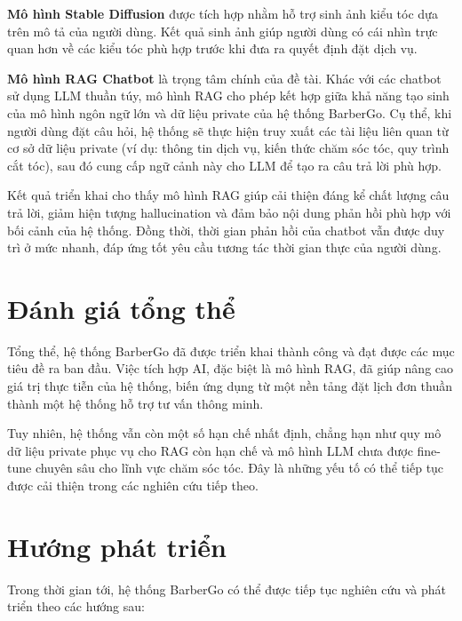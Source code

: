 \textbf{Mô hình Stable Diffusion} được tích hợp nhằm hỗ trợ sinh ảnh kiểu tóc dựa trên mô tả của người dùng. Kết quả sinh ảnh giúp người dùng có cái nhìn trực quan hơn về các kiểu tóc phù hợp trước khi đưa ra quyết định đặt dịch vụ.

\textbf{Mô hình RAG Chatbot} là trọng tâm chính của đề tài. Khác với các chatbot sử dụng LLM thuần túy, mô hình RAG cho phép kết hợp giữa khả năng tạo sinh của mô hình ngôn ngữ lớn và dữ liệu private của hệ thống BarberGo. Cụ thể, khi người dùng đặt câu hỏi, hệ thống sẽ thực hiện truy xuất các tài liệu liên quan từ cơ sở dữ liệu private (ví dụ: thông tin dịch vụ, kiến thức chăm sóc tóc, quy trình cắt tóc), sau đó cung cấp ngữ cảnh này cho LLM để tạo ra câu trả lời phù hợp.

Kết quả triển khai cho thấy mô hình RAG giúp cải thiện đáng kể chất lượng câu trả lời, giảm hiện tượng hallucination và đảm bảo nội dung phản hồi phù hợp với bối cảnh của hệ thống. Đồng thời, thời gian phản hồi của chatbot vẫn được duy trì ở mức nhanh, đáp ứng tốt yêu cầu tương tác thời gian thực của người dùng.

\section{Đánh giá tổng thể}

Tổng thể, hệ thống BarberGo đã được triển khai thành công và đạt được các mục tiêu đề ra ban đầu. Việc tích hợp AI, đặc biệt là mô hình RAG, đã giúp nâng cao giá trị thực tiễn của hệ thống, biến ứng dụng từ một nền tảng đặt lịch đơn thuần thành một hệ thống hỗ trợ tư vấn thông minh.

Tuy nhiên, hệ thống vẫn còn một số hạn chế nhất định, chẳng hạn như quy mô dữ liệu private phục vụ cho RAG còn hạn chế và mô hình LLM chưa được fine-tune chuyên sâu cho lĩnh vực chăm sóc tóc. Đây là những yếu tố có thể tiếp tục được cải thiện trong các nghiên cứu tiếp theo.

\section{Hướng phát triển}

Trong thời gian tới, hệ thống BarberGo có thể được tiếp tục nghiên cứu và phát triển theo các hướng sau:

